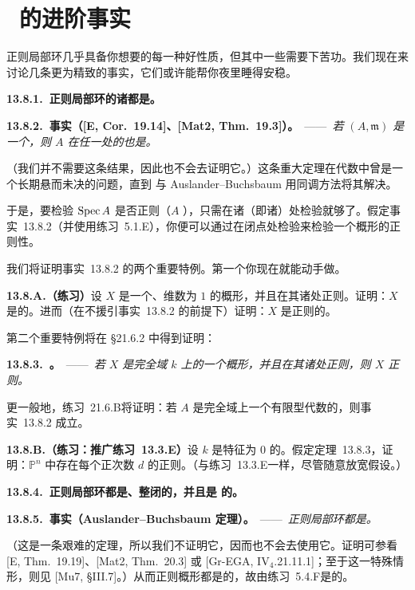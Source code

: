 
\section{\hard\ \trRegular\trLocalRing{}的进阶事实}

正则局部环几乎具备你想要的每一种好性质，但其中一些需要下苦功。我们现在来讨论几条更为精致的事实，它们或许能帮你夜里睡得安稳。

\textbf{13.8.1.\ 正则局部环的诸\trLocalization{}都是\trRegular\trLocalRing。}

\textbf{13.8.2.\ 事实（[E, Cor.~19.14]、[Mat2, Thm.~19.3]）。}\ ——\ \emph{若 $(A,\mathfrak{m})$ 是一个\trRegular\trLocalRing，则 $A$ 在任一\trPrimeIdeal{}处的\trLocalization{}也是\trRegular\trLocalRing。}

（我们并不需要这条结果，因此也不会去证明它。）这条重大定理在\trCommutative{}代数中曾是一个长期悬而未决的问题，直到 \trSerre{}与 Auslander--Buchsbaum 用同调方法将其解决。

于是，要检验 $\operatorname{Spec} A$ 是否正则（$A$ \trNoetherian），只需在诸\trClosedPoint{}（即诸\trMaximalIdeal{}）处检验就够了。假定事实~13.8.2（并使用\mbox{练习~5.1.E}），你便可以通过在闭点处检验来检验一个\trNoetherian{}概形的正则性。

我们将证明事实~13.8.2 的两个重要特例。第一个你现在就能动手做。

\textbf{13.8.A.（练习）}\quad 设 $X$ 是一个\trNoetherian{}、维数为 $1$ 的概形，并且在其诸\trClosedPoint{}处正则。证明：$X$ 是\trReduced{}的。进而（在不援引事实~13.8.2 的前提下）证明：$X$ 是正则的。

第二个重要特例将在 \S21.6.2 中得到证明：

\textbf{13.8.3.\ \trhTheorem{}。}\ ——\ \emph{若 $X$ 是完全域 $k$ 上的一个\trFiniteType{}概形，并且在其诸\trClosedPoint{}处正则，则 $X$ 正则。}

更一般地，\mbox{练习~21.6.B}将证明：若 $A$ 是完全域上一个有限型代数的\trLocalization，则事实~13.8.2 成立。

\textbf{13.8.B.（练习：推广\mbox{练习~13.3.E}）}\quad 设 $k$ 是特征为 $0$ 的\trAlgClosedField。假定定理~13.8.3，证明：$\mathbb{P}^n$ 中存在每个正次数 $d$ 的正则\trHypersurface。（与\mbox{练习~13.3.E}一样，尽管随意放宽假设。）

\textbf{13.8.4.\ 正则局部环都是\trUFD、整闭的，并且是 \trCM{}的。}

\textbf{13.8.5.\ 事实（Auslander--Buchsbaum 定理）。}\ ——\ \emph{正则局部环都是\trUFD。}

（这是一条艰难的定理，所以我们不证明它，因而也不会去使用它。证明可参看 [E, Thm.~19.19]、[Mat2, Thm.~20.3] 或 [Gr-EGA, IV$_4$.21.11.1]；至于\trVariety{}这一特殊情形，则见 [Mu7, \S III.7]。）从而正则概形都是\trFactorial{}的，故由\mbox{练习~5.4.F}是\trNormal{}的。


